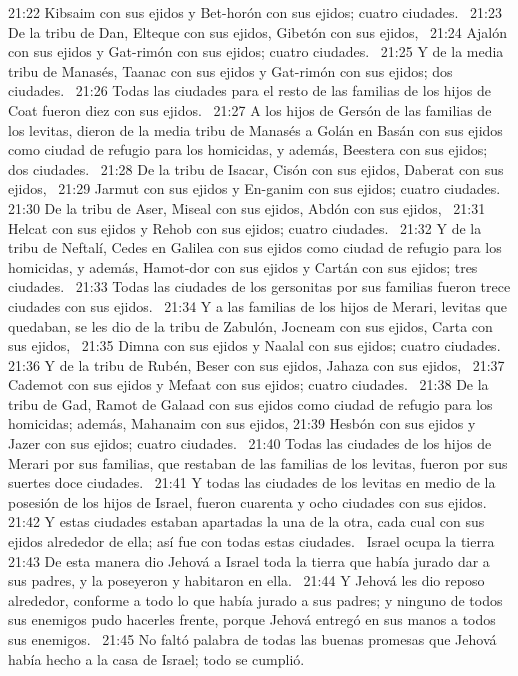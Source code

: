 21:22 Kibsaim con sus ejidos y Bet-horón con sus ejidos; cuatro ciudades.  
21:23 De la tribu de Dan, Elteque con sus ejidos, Gibetón con sus ejidos,  
21:24 Ajalón con sus ejidos y Gat-rimón con sus ejidos; cuatro ciudades.  
21:25 Y de la media tribu de Manasés, Taanac con sus ejidos y Gat-rimón con sus ejidos; dos ciudades.  
21:26 Todas las ciudades para el resto de las familias de los hijos de Coat fueron diez con sus ejidos.  
21:27 A los hijos de Gersón de las familias de los levitas, dieron de la media tribu de Manasés a Golán en Basán con sus ejidos como ciudad de refugio para los homicidas, y además, Beestera con sus ejidos; dos ciudades.  
21:28 De la tribu de Isacar, Cisón con sus ejidos, Daberat con sus ejidos,  
21:29 Jarmut con sus ejidos y En-ganim con sus ejidos; cuatro ciudades.  
21:30 De la tribu de Aser, Miseal con sus ejidos, Abdón con sus ejidos,  
21:31 Helcat con sus ejidos y Rehob con sus ejidos; cuatro ciudades.  
21:32 Y de la tribu de Neftalí, Cedes en Galilea con sus ejidos como ciudad de refugio para los homicidas, y además, Hamot-dor con sus ejidos y Cartán con sus ejidos; tres ciudades.  
21:33 Todas las ciudades de los gersonitas por sus familias fueron trece ciudades con sus ejidos.  
21:34 Y a las familias de los hijos de Merari, levitas que quedaban, se les dio de la tribu de Zabulón, Jocneam con sus ejidos, Carta con sus ejidos,  
21:35 Dimna con sus ejidos y Naalal con sus ejidos; cuatro ciudades.  
21:36 Y de la tribu de Rubén, Beser con sus ejidos, Jahaza con sus ejidos,  
21:37 Cademot con sus ejidos y Mefaat con sus ejidos; cuatro ciudades.  
21:38 De la tribu de Gad, Ramot de Galaad con sus ejidos como ciudad de refugio para los homicidas; además, Mahanaim con sus ejidos, 
21:39 Hesbón con sus ejidos y Jazer con sus ejidos; cuatro ciudades.  
21:40 Todas las ciudades de los hijos de Merari por sus familias, que restaban de las familias de los levitas, fueron por sus suertes doce ciudades.  
21:41 Y todas las ciudades de los levitas en medio de la posesión de los hijos de Israel, fueron cuarenta y ocho ciudades con sus ejidos.  
21:42 Y estas ciudades estaban apartadas la una de la otra, cada cual con sus ejidos alrededor de ella; así fue con todas estas ciudades.  
Israel ocupa la tierra  
21:43 De esta manera dio Jehová a Israel toda la tierra que había jurado dar a sus padres, y la poseyeron y habitaron en ella.  
21:44 Y Jehová les dio reposo alrededor, conforme a todo lo que había jurado a sus padres; y ninguno de todos sus enemigos pudo hacerles frente, porque Jehová entregó en sus manos a todos sus enemigos.  
21:45 No faltó palabra de todas las buenas promesas que Jehová había hecho a la casa de Israel; todo se cumplió.  
